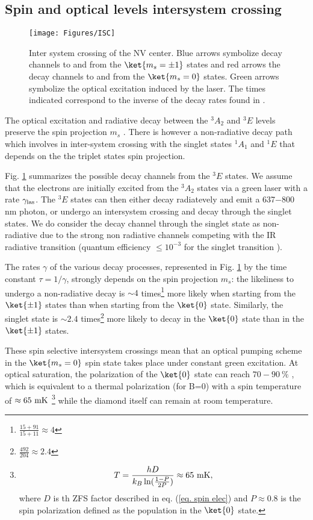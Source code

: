 \documentclass[a4paper,11pt]{report}
\begin{document}
\subsection{Spin and optical levels intersystem crossing}
\begin{figure}[h!]
\centering
\texttt{[image: Figures/ISC]}
\caption{Inter system crossing of the NV center. Blue arrows symbolize decay channels to and from the $\ket{m_s=\pm 1}$ states and red arrows the decay channels to and from the $\ket{m_s=0}$ states. Green arrows symbolize the optical excitation induced by the laser. The times indicated correspond to the inverse of the decay rates found in \citep{gupta2016efficient}.}
\label{ISC}
\end{figure}

The optical excitation and radiative decay between the $^3A_2$ and $^3E$ levels preserve the spin projection $m_s$ \citep{robledo2011spin}. There is however a non-radiative decay path which involves in inter-system crossing with the singlet states $^1A_1$ and $^1E$ that depends on the the triplet states spin projection.

Fig. \ref{ISC} summarizes the possible decay channels from the $^3E$ states. We assume that the electrons are initially excited from the $^3A_2$ states via a green laser with a rate $\gamma_{\rm las}$. The $^3E$ states can then either decay radiatevely and emit a 637$-$800 nm photon, or undergo an intersystem crossing and decay through the singlet states. We do consider the decay channel through the singlet state as non-radiative due to the strong non radiative channels competing with the IR radiative transition (quantum efficiency $\leq 10^{-3}$ for the singlet transition \citep{rogers2008infrared, ma2010excited, acosta2010optical}).

The rates $\gamma$ of the various decay processes, represented in Fig. \ref{ISC} by the time constant $\tau=1/\gamma$, strongly depends on the spin projection $m_s$: the likeliness to undergo a non-radiative decay is $\sim 4$ times\footnote{$\frac{15+91}{15+11}\approx 4$} more likely when starting from the $\ket{\pm 1}$ states than when starting from the $\ket{0}$ state. Similarly, the singlet state is $\sim 2.4$ times\footnote{$\frac{492}{204} \approx 2.4$} more likely to decay in the $\ket{0}$ state than in the $\ket{\pm 1}$ states.

These spin selective intersystem crossings mean that an optical pumping scheme in the $\ket{m_s=0}$ spin state takes place under constant green excitation. At optical saturation, the polarization of the $\ket{0}$ state can reach $70-90\ \%$ \citep{gupta2016efficient}, which is equivalent to a thermal polarization (for B=0) with a spin temperature of $\approx 65\ \rm mK$ \footnote{\begin{equation*}
T=\frac{h D}{k_B \ln (\frac{1-P}{2P})} \approx 65\ \rm mK,
\end{equation*}
where $D$ is th ZFS factor described in eq. (\ref{eq. spin elec}) and $P\approx 0.8$ is the spin polarization defined as the population in the $\ket{0}$ state.} while the diamond itself can remain at room temperature.
\end{document}
